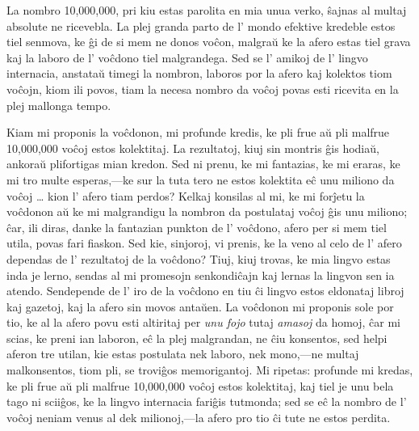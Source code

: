 
La nombro 10,000,000, pri kiu estas parolita en mia unua verko, ŝajnas al multaj absolute ne ricevebla. La plej granda parto de l' mondo efektive kredeble estos tiel senmova, ke ĝi de si mem ne donos voĉon, malgraŭ ke la afero estas tiel grava kaj la laboro de l' voĉdono tiel malgrandega. Sed se l' amikoj de l' lingvo internacia, anstataŭ timegi la nombron, laboros por la afero kaj kolektos tiom voĉojn, kiom ili povos, tiam la necesa nombro da voĉoj povas esti ricevita en la plej mallonga tempo.

Kiam mi proponis la voĉdonon, mi profunde kredis, ke pli frue aŭ pli malfrue 10,000,000 voĉoj estos kolektitaj. La rezultatoj, kiuj sin montris ĝis hodiaŭ, ankoraŭ plifortigas mian kredon. Sed ni prenu, ke mi fantazias, ke mi eraras, ke mi tro multe esperas,---ke sur la tuta tero ne estos kolektita eĉ unu miliono da voĉoj \ldots{} kion l' afero tiam perdos? Kelkaj konsilas al mi, ke mi forĵetu la voĉdonon aŭ ke mi malgrandigu la nombron da postulataj voĉoj ĝis unu miliono; \glqq{}ĉar\grqq{}, ili diras, \glqq{}danke la fantazian punkton de l' voĉdono, afero per si mem tiel utila, povas fari fiaskon.\grqq{} Sed kie, sinjoroj, vi prenis, ke la veno al celo de l' afero dependas de l' rezultatoj de la voĉdono? Tiuj, kiuj trovas, ke mia lingvo estas inda je lerno, sendas al mi promesojn senkondiĉajn kaj lernas la lingvon sen ia atendo. Sendepende de l' iro de la voĉdono en tiu ĉi lingvo estos eldonataj libroj kaj gazetoj, kaj la afero sin movos antaŭen. La voĉdonon mi proponis sole por tio, ke al la afero povu esti altiritaj per \emph{unu fojo} tutaj \emph{amasoj} da homoj, ĉar mi scias, ke preni ian laboron, eĉ la plej malgrandan, ne ĉiu konsentos, sed helpi aferon tre utilan, kie estas postulata nek laboro, nek mono,---ne multaj malkonsentos, tiom pli, se troviĝos memorigantoj. Mi ripetas: profunde mi kredas, ke pli frue aŭ pli malfrue 10,000,000 voĉoj estos kolektitaj, kaj tiel je unu bela tago ni sciiĝos, ke la lingvo internacia fariĝis tutmonda; sed se eĉ la nombro de l' voĉoj neniam venus al dek milionoj,---la afero pro tio ĉi tute ne estos perdita.

